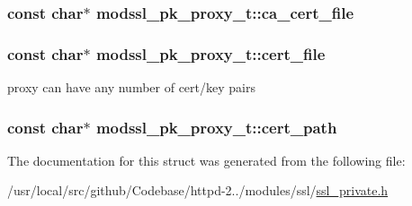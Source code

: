 \subsubsection[{\texorpdfstring{ca\+\_\+cert\+\_\+file}{ca_cert_file}}]{\setlength{\rightskip}{0pt plus 5cm}const char$\ast$ modssl\+\_\+pk\+\_\+proxy\+\_\+t\+::ca\+\_\+cert\+\_\+file}\hypertarget{structmodssl__pk__proxy__t_a4e679824c7fb437c278c5915b248b770}{}\label{structmodssl__pk__proxy__t_a4e679824c7fb437c278c5915b248b770}
\subsubsection[{\texorpdfstring{cert\+\_\+file}{cert_file}}]{\setlength{\rightskip}{0pt plus 5cm}const char$\ast$ modssl\+\_\+pk\+\_\+proxy\+\_\+t\+::cert\+\_\+file}\hypertarget{structmodssl__pk__proxy__t_a1641198cd22edd2f715964ee71dea901}{}\label{structmodssl__pk__proxy__t_a1641198cd22edd2f715964ee71dea901}
proxy can have any number of cert/key pairs 
\subsubsection[{\texorpdfstring{cert\+\_\+path}{cert_path}}]{\setlength{\rightskip}{0pt plus 5cm}const char$\ast$ modssl\+\_\+pk\+\_\+proxy\+\_\+t\+::cert\+\_\+path}\hypertarget{structmodssl__pk__proxy__t_aa92a13af4015ad4ac56abaec4c6f758b}{}\label{structmodssl__pk__proxy__t_aa92a13af4015ad4ac56abaec4c6f758b}


The documentation for this struct was generated from the following file\+:\begin{DoxyCompactItemize}
\item 
/usr/local/src/github/\+Codebase/httpd-\/2../modules/ssl/\hyperlink{ssl__private_8h}{ssl\+\_\+private.\+h}\end{DoxyCompactItemize}
